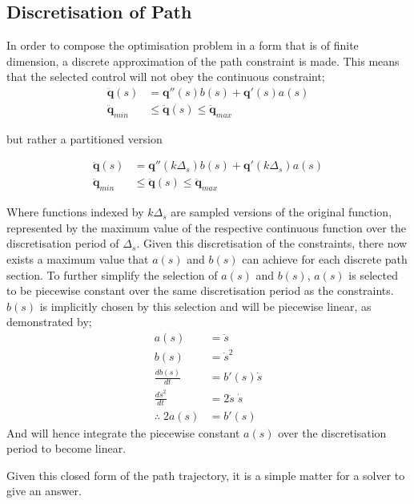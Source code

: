 \subsection{Discretisation of Path}

In order to compose the optimisation problem in a form that is of finite dimension, a discrete approximation of the path constraint is made. This means that the selected control will not obey the continuous constraint;
\begin{align*}
\ddot{\textbf{q}}(s) &= \textbf{q}''(s)b(s) + \textbf{q}'(s)a(s)\\
\ddot{\textbf{q}}_{min} &\leq \ddot{\textbf{q}}(s) \leq \ddot{\textbf{q}}_{max}
\end{align*}

but rather a partitioned version

\begin{align*}
\ddot{\textbf{q}}(s) &= \textbf{q}''(k \Delta_s)b(s) + \textbf{q}'(k\Delta_s)a(s)\\
\ddot{\textbf{q}}_{min} &\leq \ddot{\textbf{q}}(s) \leq \ddot{\textbf{q}}_{max}
\end{align*}

Where functions indexed by $k\Delta_s$ are sampled versions of the original function, represented by the maximum value of the respective continuous function over the discretisation period of $\Delta_s$.
Given this discretisation of the constraints, there now exists a maximum value that $a(s)$ and $b(s)$ can achieve for each discrete path section. To further simplify the selection of $a(s)$ and $b(s)$, $a(s)$ is selected to be piecewise constant over the same discretisation period as the constraints. $b(s)$ is implicitly chosen by this selection and will be piecewise linear, as demonstrated by;
\begin{align*}
a(s) &= \ddot{s}\\
b(s) &= \dot{s}^2\\
\frac{db(s)}{dt} &= b'(s)\dot{s}\\
\frac{d\dot{s}^2}{dt} &= 2\ddot{s}\;\dot{s}\\
\therefore \; 2a(s) &= b'(s)  
\end{align*}
And will hence integrate the piecewise constant $a(s)$ over the discretisation period to become linear.
 
Given this closed form of the path trajectory, it is a simple matter for a solver to give an answer.

